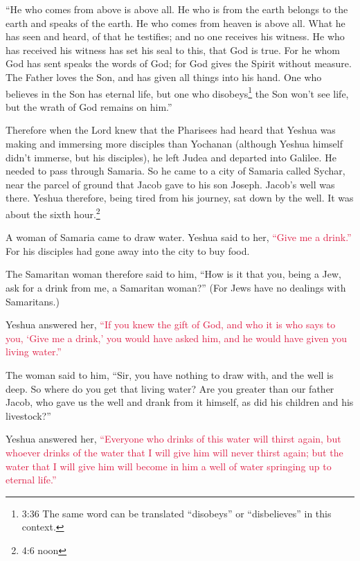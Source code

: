 \myverse{}“He who comes from above is above all. He who is from the earth
belongs to the earth and speaks of the earth. He who comes from heaven is above all.
\myverse{}What he has seen and heard, of that he testifies; and no one receives his
witness.
\myverse{}He who has received his witness has set his seal to this, that God is true.
\myverse{}For he whom God has sent speaks the words of God; for God gives the Spirit
without measure.
\myverse{}The Father loves the Son, and has given all things into his hand.
\myverse{}One who believes in the Son has eternal life, but one who disobeys\footnote{3:36 The same word can be translated “disobeys” or “disbelieves” in this context.} the Son
won’t see life, but the wrath of God remains on him.”


\mychapter{} \myverse*{}Therefore when the Lord knew that the Pharisees had heard that
Yeshua was making and immersing more disciples than Yochanan
\myverse{}(although Yeshua himself didn’t immerse, but his disciples),
\myverse{}he left Judea and departed into Galilee.
\myverse{}He needed to pass through Samaria.
\myverse{}So he came to a city of Samaria called Sychar, near the parcel of ground that
Jacob gave to his son Joseph.
\myverse{}Jacob’s well was there. Yeshua therefore, being tired from his journey, sat
down by the well. It was about the sixth hour.\footnote{4:6 noon}

\myverse{}A woman of Samaria came to draw water. Yeshua said to her,
\textcolor{crimson}{“Give me a drink.”}
\myverse{}For his disciples had gone away into the city to buy food.

\myverse{}The Samaritan woman therefore said to him, “How is it that you,
being a Jew, ask for a drink from me, a Samaritan woman?” (For Jews have no dealings with Samaritans.)

\myverse{}Yeshua answered her,
\textcolor{crimson}{“If you knew the gift of God, and who it is who says to you, ‘Give me a drink,’ you would have asked
	him, and he would have given you living water.”}

\myverse{}The woman said to him, “Sir, you have nothing to draw with, and
the well is deep. So where do you get that living water?
\myverse{}Are you greater than our father Jacob, who gave us the well and drank from
it himself, as did his children and his livestock?”

\myverse{}Yeshua answered her,
\textcolor{crimson}{“Everyone who drinks of this water will thirst again,
}
\myverse{}\textcolor{crimson}{but whoever drinks of the water that I will give him will never thirst
	again; but the water that I will give him will become in him a well of water springing up to eternal life.”}

